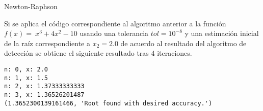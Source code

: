 \begin{algorithm}[H]
\SetAlgoLined
{}
\BlankLine
\caption{Newton-Raphson}
\label{alg:newton}
\end{algorithm}



Si se aplica el código correspondiente al algoritmo anterior a la función $f (x) = \ x^3 + 4x^2 - 10$ usando una tolerancia $tol = 10^{-8}$ y una estimación inicial de la raíz correspondiente a $x_2=2.0$ de acuerdo al resultado del algoritmo de detección se obtiene el siguiente resultado tras 4 iteraciones.
\begin{verbatim}
n: 0, x: 2.0
n: 1, x: 1.5
n: 2, x: 1.37333333333
n: 3, x: 1.36526201487
(1.3652300139161466, 'Root found with desired accuracy.')
\end{verbatim}

\newpage
